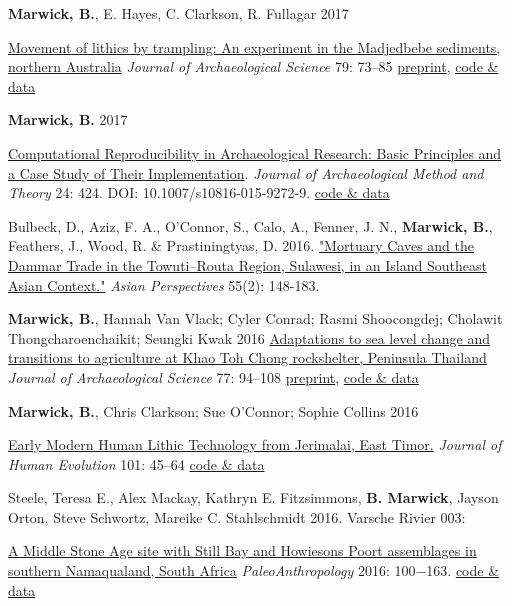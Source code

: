 \documentclass[11pt,article,oneside]{memoir}
\begin{document}
\ind  \textbf{Marwick, B.}, E. Hayes, C. Clarkson, R. Fullagar 2017 {\href{https://doi.org/10.1016/j.jas.2017.01.008}{Movement of lithics by trampling: An experiment in the Madjedbebe sediments, northern Australia} \textit{Journal of Archaeological Science}  79: 73–85 \href{https://doi.org/10.17605/OSF.IO/V2MS9}{preprint}, \href{https://doi.org/10.17605/OSF.IO/EDZXS}{code \& data}

\ind \textbf{Marwick, B.} 2017 {\href{http://dx.doi.org/10.1007/s10816-015-9272-9}{Computational Reproducibility in Archaeological Research: Basic Principles and a Case Study of Their Implementation}. \textit{Journal of Archaeological Method and Theory} 24: 424. DOI: 10.1007/s10816-015-9272-9. \href{https://doi.org/10.6084/m9.figshare.1563661}{code \& data}

\ind  Bulbeck, D., Aziz, F. A.,  O'Connor, S.,  Calo, A., Fenner, J. N., \textbf{Marwick, B.},  Feathers, J.,  Wood, R. \& Prastiningtyas, D. 2016. \href{http://dx.doi.org/10.1353/asi.2016.0017}{"Mortuary Caves and the Dammar Trade in the Towuti–Routa Region, Sulawesi, in an Island Southeast Asian Context."} \textit{Asian Perspectives} 55(2): 148-183.

\ind  \textbf{Marwick, B.}, Hannah Van Vlack; Cyler Conrad; Rasmi Shoocongdej; Cholawit Thongcharoenchaikit; Seungki Kwak 2016 \href{http://dx.doi.org/10.1016/j.jas.2016.10.010}{Adaptations to sea level change and transitions to agriculture at Khao Toh Chong rockshelter, Peninsula Thailand} \textit{Journal of Archaeological Science} 77: 94–108 \href{https://osf.io/preprints/socarxiv/axxf8/}{preprint}, \href{https://dx.doi.org/10.6084/m9.figshare.2065602}{code \& data}

\ind  \textbf{Marwick, B.}, Chris Clarkson; Sue O'Connor; Sophie Collins 2016 {\href{http://dx.doi.org/10.1016/j.jhevol.2016.09.004}{Early Modern Human Lithic Technology from Jerimalai, East Timor.} \textit{Journal of Human Evolution} 101: 45–64 \href{http://dx.doi.org/10.6084/m9.figshare.985406}{code \& data}

\ind Steele, Teresa E., Alex Mackay, Kathryn E. Fitzsimmons,  \textbf{B. Marwick}, Jayson Orton, Steve Schwortz, Mareike C. Stahlschmidt 2016. Varsche Rivier 003:  {\href{http://www.paleoanthro.org/media/journal/content/PA20160100.pdf}{A Middle Stone Age site with Still Bay and Howiesons Poort assemblages in southern Namaqualand, South Africa} \textit{PaleoAnthropology} 2016: 100−163. \href{https://github.com/benmarwick/Steele_et_al_VR003_MSA_Pigments}{code \& data}

}}}}
\end{document}
